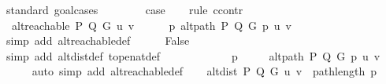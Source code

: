 \begin{isabellebody}
%
\isadelimproof
%
\endisadelimproof
%
\isatagproof
{}\isamarkupfalse%
\ {\isacharparenleft}{\kern0pt}standard{\isacharcomma}{\kern0pt}\ goal{\isacharunderscore}{\kern0pt}cases{\isacharparenright}{\kern0pt}\isanewline
\ \ \isamarkupfalse%
\ {}\isanewline
\ \ \isamarkupfalse%
\ {\isacharquery}{\kern0pt}case\isanewline
\ \ \isamarkupfalse%
\ {\isacharparenleft}{\kern0pt}rule\ ccontr{\isacharparenright}{\kern0pt}\isanewline
\ \ \ \ \isamarkupfalse%
\ {\isachardoublequoteopen}{\isasymnot}\ alt{\isacharunderscore}{\kern0pt}reachable\ P\ Q\ G\ u\ v{\isachardoublequoteclose}\isanewline
\ \ \ \ \isamarkupfalse%
\ {\isachardoublequoteopen}{\isacharbraceleft}{\kern0pt}p{\isachardot}{\kern0pt}\ alt{\isacharunderscore}{\kern0pt}path\ P\ Q\ G\ p\ u\ v{\isacharbraceright}{\kern0pt}\ {\isacharequal}{\kern0pt}\ {\isacharbraceleft}{\kern0pt}{\isacharbraceright}{\kern0pt}{\isachardoublequoteclose}\isanewline
\ \ \ \ \ \ \isamarkupfalse%
\ {\isacharparenleft}{\kern0pt}simp\ add{\isacharcolon}{\kern0pt}\ alt{\isacharunderscore}{\kern0pt}reachable{\isacharunderscore}{\kern0pt}def{\isacharparenright}{\kern0pt}\isanewline
\ \ \ \ \isamarkupfalse%
\ {\isachardoublequoteopen}False{\isachardoublequoteclose}\isanewline
\ \ \ \ \ \ \isamarkupfalse%
\ {}\isanewline
\ \ \ \ \ \ \isamarkupfalse%
\ {\isacharparenleft}{\kern0pt}simp\ add{\isacharcolon}{\kern0pt}\ alt{\isacharunderscore}{\kern0pt}dist{\isacharunderscore}{\kern0pt}def\ top{\isacharunderscore}{\kern0pt}enat{\isacharunderscore}{\kern0pt}def{\isacharparenright}{\kern0pt}\isanewline
\ \ \isamarkupfalse%
\isanewline
{}\isamarkupfalse%
\isanewline
\ \ \isamarkupfalse%
\ {}\isanewline
\ \ \isamarkupfalse%
\ \isamarkupfalse%
\ p\ \isanewline
\ \ \ \ {\isachardoublequoteopen}alt{\isacharunderscore}{\kern0pt}path\ P\ Q\ G\ p\ u\ v{\isachardoublequoteclose}\isanewline
\ \ \ \ \isamarkupfalse%
\ {\isacharparenleft}{\kern0pt}auto\ simp\ add{\isacharcolon}{\kern0pt}\ alt{\isacharunderscore}{\kern0pt}reachable{\isacharunderscore}{\kern0pt}def{\isacharparenright}{\kern0pt}\isanewline
\ \ \isamarkupfalse%
\ {\isachardoublequoteopen}alt{\isacharunderscore}{\kern0pt}dist\ P\ Q\ G\ u\ v\ {\isasymle}\ path{\isacharunderscore}{\kern0pt}length\ p{\isachardoublequoteclose}\isanewline
\ \ \ \ \isamarkupfalse%

\end{isabellebody}
